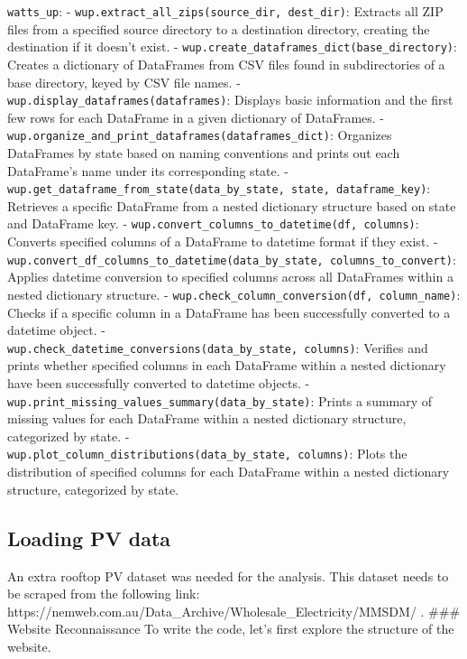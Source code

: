 \documentclass[
]{article}
\begin{document}
\texttt{watts\_up}: -
\texttt{wup.extract\_all\_zips(source\_dir,\ dest\_dir)}: Extracts all
ZIP files from a specified source directory to a destination directory,
creating the destination if it doesn't exist. -
\texttt{wup.create\_dataframes\_dict(base\_directory)}: Creates a
dictionary of DataFrames from CSV files found in subdirectories of a
base directory, keyed by CSV file names. -
\texttt{wup.display\_dataframes(dataframes)}: Displays basic information
and the first few rows for each DataFrame in a given dictionary of
DataFrames. -
\texttt{wup.organize\_and\_print\_dataframes(dataframes\_dict)}:
Organizes DataFrames by state based on naming conventions and prints out
each DataFrame's name under its corresponding state. -
\texttt{wup.get\_dataframe\_from\_state(data\_by\_state,\ state,\ dataframe\_key)}:
Retrieves a specific DataFrame from a nested dictionary structure based
on state and DataFrame key. -
\texttt{wup.convert\_columns\_to\_datetime(df,\ columns)}: Converts
specified columns of a DataFrame to datetime format if they exist. -
\texttt{wup.convert\_df\_columns\_to\_datetime(data\_by\_state,\ columns\_to\_convert)}:
Applies datetime conversion to specified columns across all DataFrames
within a nested dictionary structure. -
\texttt{wup.check\_column\_conversion(df,\ column\_name)}: Checks if a
specific column in a DataFrame has been successfully converted to a
datetime object. -
\texttt{wup.check\_datetime\_conversions(data\_by\_state,\ columns)}:
Verifies and prints whether specified columns in each DataFrame within a
nested dictionary have been successfully converted to datetime objects.
- \texttt{wup.print\_missing\_values\_summary(data\_by\_state)}: Prints
a summary of missing values for each DataFrame within a nested
dictionary structure, categorized by state. -
\texttt{wup.plot\_column\_distributions(data\_by\_state,\ columns)}:
Plots the distribution of specified columns for each DataFrame within a
nested dictionary structure, categorized by state.

\subsection{Loading PV data}\label{loading-pv-data}

An extra rooftop PV dataset was needed for the analysis. This dataset
needs to be scraped from the following link:
https://nemweb.com.au/Data\_Archive/Wholesale\_Electricity/MMSDM/ .
\#\#\# Website Reconnaissance To write the code, let's first explore the
structure of the website.
\end{document}
